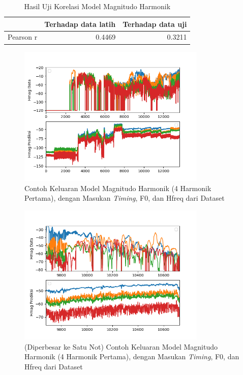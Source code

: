 \begin{table}[htbp]
    \centering
    \caption{Hasil Uji Korelasi Model Magnitudo Harmonik}\label{tab-mag-testing-results}
    \begin{tabular}{ |l|r|r| } 
     \cline{2-3}
     \multicolumn{1}{l|}{}&Terhadap data latih&Terhadap data uji\\\hline
	 Pearson r&0.4469  &0.3211\\\hline
    \end{tabular}
\end{table}

\begin{figure}[htbp]
    \centering
    \includegraphics[width=0.8\textwidth]{resources/Analisis_Hmag.png}
    \caption{Contoh Keluaran Model Magnitudo Harmonik (4 Harmonik Pertama), dengan Masukan \textit{Timing}, F0, dan Hfreq dari Dataset}\label{fig-hmag-output-sample}
\end{figure}

\begin{figure}[htbp]
    \centering
    \includegraphics[width=0.8\textwidth]{resources/Analisis_Hmag_zoomed.png}
    \caption{(Diperbesar ke Satu Not) Contoh Keluaran Model Magnitudo Harmonik (4 Harmonik Pertama), dengan Masukan \textit{Timing}, F0, dan Hfreq dari Dataset}\label{fig-hmag-output-sample-zoomed}
\end{figure}

